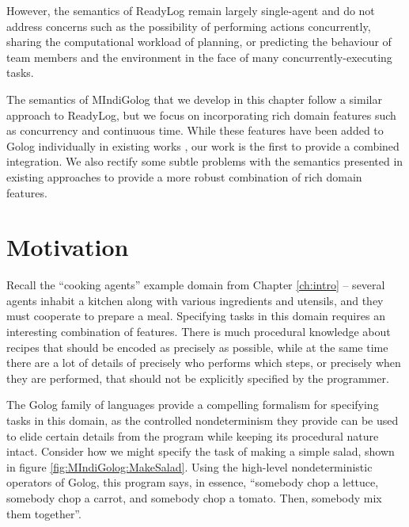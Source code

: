 However, the semantics of ReadyLog remain largely single-agent and
do not address concerns such as the possibility of performing actions
concurrently, sharing the computational workload of planning, or predicting
the behaviour of team members and the environment in the face of many
concurrently-executing tasks.

The semantics of MIndiGolog that we develop in this chapter follow
a similar approach to ReadyLog, but we focus on incorporating rich
domain features such as concurrency and continuous time. While these
features have been added to Golog individually in existing works \citep{Reiter98seq_temp_golog,pinto99tcongolog,pirri00planning_nat_acts,reiter01kia},
our work is the first to provide a combined integration. We also rectify
some subtle problems with the semantics presented in existing approaches
to provide a more robust combination of rich domain features.


\section{Motivation\label{sec:MIndiGolog:Motivation}}

Recall the {}``cooking agents'' example domain from Chapter \ref{ch:intro}
-- several agents inhabit a kitchen along with various ingredients
and utensils, and they must cooperate to prepare a meal. Specifying
tasks in this domain requires an interesting combination of features.
There is much procedural knowledge about recipes that should be encoded
as precisely as possible, while at the same time there are a lot of
details of precisely who performs which steps, or precisely when they
are performed, that should not be explicitly specified by the programmer.

The Golog family of languages provide a compelling formalism for specifying
tasks in this domain, as the controlled nondeterminism they provide
can be used to elide certain details from the program while keeping
its procedural nature intact. Consider how we might specify the task
of making a simple salad, shown in figure \ref{fig:MIndiGolog:MakeSalad}.
Using the high-level nondeterministic operators of Golog, this program
says, in essence, {}``somebody chop a lettuce, somebody chop a carrot,
and somebody chop a tomato. Then, somebody mix them together''.

